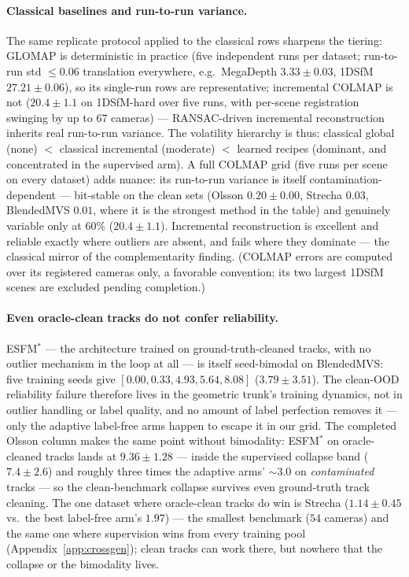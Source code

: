 \documentclass{article}
\begin{document}
\paragraph{Classical baselines and run-to-run variance.} The same replicate protocol
applied to the classical rows sharpens the tiering: GLOMAP is deterministic in practice
(five independent runs per dataset; run-to-run std $\le 0.06$ translation everywhere,
e.g.\ MegaDepth $3.33\pm0.03$, 1DSfM $27.21\pm0.06$), so its single-run rows are
representative; incremental COLMAP is not ($20.4\pm1.1$ on 1DSfM-hard over five runs,
with per-scene registration swinging by up to $67$ cameras) --- RANSAC-driven
incremental reconstruction inherits real run-to-run variance. The volatility hierarchy
is thus: classical global (none) $<$ classical incremental (moderate) $<$ learned
recipes (dominant, and concentrated in the supervised arm). A full COLMAP grid (five runs per scene on every dataset) adds nuance: its
run-to-run variance is itself contamination-dependent --- bit-stable on the clean sets
(Olsson $0.20\pm0.00$, Strecha $0.03$, BlendedMVS $0.01$, where it is the strongest
method in the table) and genuinely variable only at $60\%$ ($20.4\pm1.1$). Incremental
reconstruction is excellent and reliable exactly where outliers are absent, and fails
where they dominate --- the classical mirror of the complementarity finding. (COLMAP
errors are computed over its registered cameras only, a favorable convention; its
two largest 1DSfM scenes are excluded pending completion.)

\paragraph{Even oracle-clean tracks do not confer reliability.} ESFM$^{\ast}$ ---
the architecture trained on ground-truth-cleaned tracks, with no outlier mechanism in
the loop at all --- is itself seed-bimodal on BlendedMVS: five training seeds give
$[0.00, 0.33, 4.93, 5.64, 8.08]$ ($3.79\pm3.51$). The clean-OOD reliability failure
therefore lives in the geometric trunk's training dynamics, not in outlier handling or
label quality, and no amount of label perfection removes it --- only the adaptive
label-free arms happen to escape it in our grid. The completed Olsson column makes the
same point without bimodality: ESFM$^{\ast}$ on oracle-cleaned tracks lands at
$9.36\pm1.28$ --- inside the supervised collapse band ($7.4\pm2.6$) and roughly three
times the adaptive arms' $\sim\!3.0$ on \emph{contaminated} tracks --- so the
clean-benchmark collapse survives even ground-truth track cleaning. The one dataset
where oracle-clean tracks do win is Strecha ($1.14\pm0.45$ vs.\ the best label-free arm's
$1.97$) --- the smallest benchmark ($54$ cameras) and the same one where supervision wins
from every training pool (Appendix~\ref{app:crossgen}); clean tracks can work there, but
nowhere that the collapse or the bimodality lives.
\end{document}
